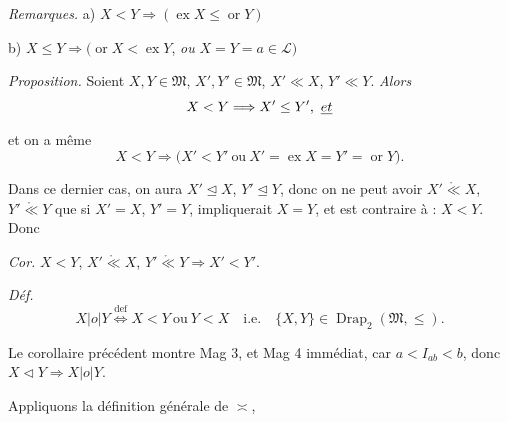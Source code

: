 \documentclass[11pt,a4paper]{article}
\begin{document}
\emph{Remarques.} a) $X < Y \Longrightarrow (\operatorname{ex} X \leq \operatorname{or} Y)$ 

b) $X \leq Y \Longrightarrow (\operatorname{or} X < \operatorname{ex} Y$, \emph{ou} $X = Y = a \in \mathcal{L})$




\emph{Proposition.} Soient $X, Y \in \mathfrak{M}$, $X', Y' \in \mathfrak{M}$, $X' \ll X$, $Y' \ll Y$. \emph{Alors} \struck{\ill{}}
\[
  X < Y \Longrightarrow X' \leq Y' , \ \struck{et}
\]
et on a même
\[
  X < Y \Longrightarrow \bigl( X' < Y' \ \text{ou} \ X' = \operatorname{ex} X = Y' = \operatorname{or} Y \bigr) .
\]

Dans ce dernier cas, on aura $X' \trianglelefteq X$, $Y' \trianglelefteq Y$, donc on ne peut avoir $X' \mathrel{\mathring{\ll}} X$, $Y' \mathrel{\mathring{\ll}} Y$ que si  $X' = X$, $Y' = Y$,   impliquerait $X = Y$, et est  contraire à : $X < Y$. Donc

\emph{Cor.} $X < Y$, $X' \mathrel{\mathring{\ll}} X$, $Y' \mathrel{\mathring{\ll}} Y \Longrightarrow X' < Y'$.

\emph{Déf.}
\[
  X \mathrel{|o|} Y \overset{\mathrm{def}}{\iff} X < Y \ \text{ou} \ Y < X \quad \text{i.e.} \quad \{X, Y\} \in \operatorname{Drap}_2(\mathfrak{M}, \leq) .
\]

Le corollaire précédent montre Mag 3, et Mag 4 immédiat, car $a < I_{ab} < b$, donc $X \lhd Y \Longrightarrow X \mathrel{|o|} Y$.



 Appliquons la définition générale de $\asymp$,

\end{document}
